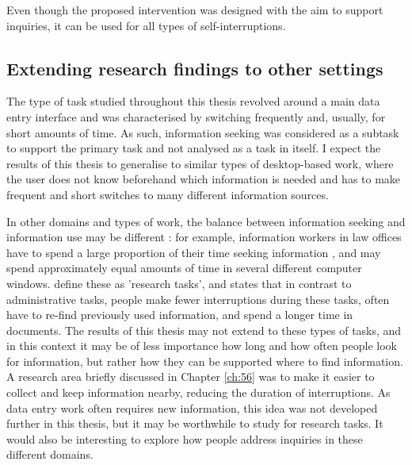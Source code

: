 Even though the proposed intervention was designed with the aim to support inquiries, it can be used for all types of self-interruptions. 

\subsection{Extending research findings to other settings}
The type of task studied throughout this thesis revolved around a main data entry interface and was characterised by switching frequently and, usually, for short amounts of time. As such, information seeking was considered as a subtask to support the primary task and not analysed as a task in itself. 
I expect the results of this thesis to generalise to similar types of desktop-based work, where the user does not know beforehand which information is needed and has to make frequent and short switches to many different information sources. 

In other domains and types of work, the balance between information seeking and information use may be different \citep{Bondarenko2005}: for example, information workers in law offices have to spend a large proportion of their time seeking information \citep{Cangiano2009}, and may spend approximately equal amounts of time in several different computer windows. \citet{Bondarenko2005} define these as 'research tasks', and states that in contrast to administrative tasks, people make fewer interruptions during these tasks, often have to re-find previously used information, and spend a longer time in documents. The results of this thesis may not extend to these types of tasks, and in this context it may be of less importance how long and how often people look for information, but rather how they can be supported where to find information. A research area briefly discussed in Chapter \ref{ch:56} was to make it easier to collect and keep information nearby, reducing the duration of interruptions. As data entry work often requires new information, this idea was not developed further in this thesis, but it may be worthwhile to study for research tasks. It would also be interesting to explore how people address inquiries in these different domains. 


